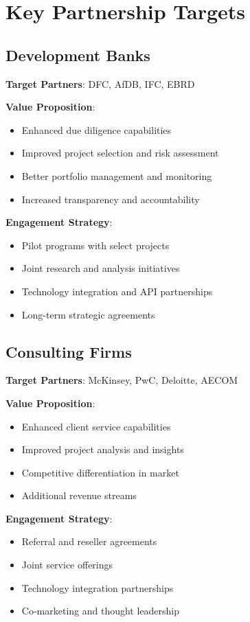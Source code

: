 \documentclass[business]{../templates/infraradar-main}
\begin{document}
\section{Key Partnership Targets}

\subsection{Development Banks}
\textbf{Target Partners}: DFC, AfDB, IFC, EBRD

\textbf{Value Proposition}:
\begin{itemize}
    \item Enhanced due diligence capabilities
    \item Improved project selection and risk assessment
    \item Better portfolio management and monitoring
    \item Increased transparency and accountability
\end{itemize}

\textbf{Engagement Strategy}:
\begin{itemize}
    \item Pilot programs with select projects
    \item Joint research and analysis initiatives
    \item Technology integration and API partnerships
    \item Long-term strategic agreements
\end{itemize}

\subsection{Consulting Firms}
\textbf{Target Partners}: McKinsey, PwC, Deloitte, AECOM

\textbf{Value Proposition}:
\begin{itemize}
    \item Enhanced client service capabilities
    \item Improved project analysis and insights
    \item Competitive differentiation in market
    \item Additional revenue streams
\end{itemize}

\textbf{Engagement Strategy}:
\begin{itemize}
    \item Referral and reseller agreements
    \item Joint service offerings
    \item Technology integration partnerships
    \item Co-marketing and thought leadership
\end{itemize}
\end{document}
